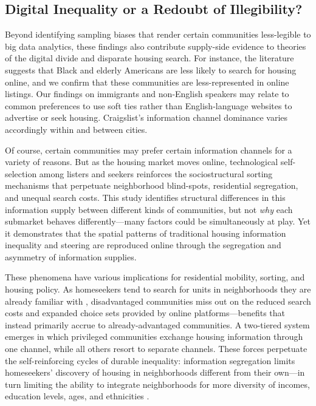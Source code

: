 \documentclass[11pt,letterpaper]{article}
\begin{document}
\subsection{Digital Inequality or a Redoubt of Illegibility?}

Beyond identifying sampling biases that render certain communities less-legible to big data analytics, these findings also contribute supply-side evidence to theories of the digital divide and disparate housing search. For instance, the literature suggests that Black and elderly Americans are less likely to search for housing online, and we confirm that these communities are less-represented in online listings. Our findings on immigrants and non-English speakers may relate to common preferences to use soft ties rather than English-language websites to advertise or seek housing. Craigslist's information channel dominance varies accordingly within and between cities.

Of course, certain communities may prefer certain information channels for a variety of reasons. But as the housing market moves online, technological self-selection among listers and seekers reinforces the sociostructural sorting mechanisms that perpetuate neighborhood blind-spots, residential segregation, and unequal search costs. This study identifies structural differences in this information supply between different kinds of communities, but not \emph{why} each submarket behaves differently---many factors could be simultaneously at play. Yet it demonstrates that the spatial patterns of traditional housing information inequality and steering are reproduced online through the segregation and asymmetry of information supplies.

These phenomena have various implications for residential mobility, sorting, and housing policy. As homeseekers tend to search for units in neighborhoods they are already familiar with \citep{krysan_cycle_2017}, disadvantaged communities miss out on the reduced search costs and expanded choice sets provided by online platforms---benefits that instead primarily accrue to already-advantaged communities. A two-tiered system emerges in which privileged communities exchange housing information through one channel, while all others resort to separate channels. These forces perpetuate the self-reinforcing cycles of durable inequality: information segregation limits homeseekers' discovery of housing in neighborhoods different from their own---in turn limiting the ability to integrate neighborhoods for more diversity of incomes, education levels, ages, and ethnicities \cite[cf.][]{krysan_cycle_2017,ellen_can_2018,pendall_pathways_2018,steil_household_2018}.
\end{document}
